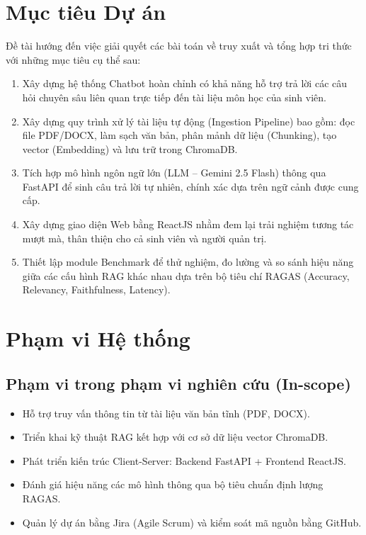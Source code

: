 \section{Mục tiêu Dự án}

Đề tài hướng đến việc giải quyết các bài toán về truy xuất và tổng hợp tri thức với những mục tiêu cụ thể sau:

\begin{enumerate}[label=\arabic*., leftmargin=*, itemsep=4pt]
  \item Xây dựng hệ thống Chatbot hoàn chỉnh có khả năng hỗ trợ trả lời các câu hỏi chuyên sâu liên quan trực tiếp đến tài liệu môn học của sinh viên.
  \item Xây dựng quy trình xử lý tài liệu tự động (Ingestion Pipeline) bao gồm: đọc file PDF/DOCX, làm sạch văn bản, phân mảnh dữ liệu (Chunking), tạo vector (Embedding) và lưu trữ trong ChromaDB.
  \item Tích hợp mô hình ngôn ngữ lớn (LLM -- Gemini 2.5 Flash) thông qua FastAPI để sinh câu trả lời tự nhiên, chính xác dựa trên ngữ cảnh được cung cấp.
  \item Xây dựng giao diện Web bằng ReactJS nhằm đem lại trải nghiệm tương tác mượt mà, thân thiện cho cả sinh viên và người quản trị.
  \item Thiết lập module Benchmark để thử nghiệm, đo lường và so sánh hiệu năng giữa các cấu hình RAG khác nhau dựa trên bộ tiêu chí RAGAS (Accuracy, Relevancy, Faithfulness, Latency).
\end{enumerate}

\section{Phạm vi Hệ thống}

\subsection{Phạm vi trong phạm vi nghiên cứu (In-scope)}

\begin{itemize}[itemsep=3pt]
  \item Hỗ trợ truy vấn thông tin từ tài liệu văn bản tĩnh (PDF, DOCX).
  \item Triển khai kỹ thuật RAG kết hợp với cơ sở dữ liệu vector ChromaDB.
  \item Phát triển kiến trúc Client-Server: Backend FastAPI + Frontend ReactJS.
  \item Đánh giá hiệu năng các mô hình thông qua bộ tiêu chuẩn định lượng RAGAS.
  \item Quản lý dự án bằng Jira (Agile Scrum) và kiểm soát mã nguồn bằng GitHub.
\end{itemize}

